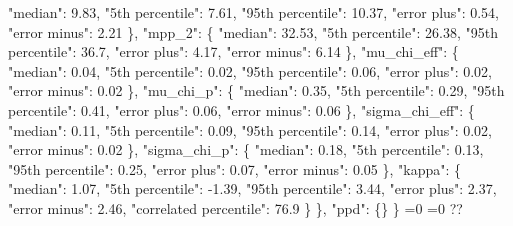 {{          "median": 9.83, %
          "5th percentile": 7.61, %
          "95th percentile": 10.37, %
          "error plus": 0.54, %
          "error minus": 2.21%
        \}, %
        "mpp\_2": \{%
          "median": 32.53, %
          "5th percentile": 26.38, %
          "95th percentile": 36.7, %
          "error plus": 4.17, %
          "error minus": 6.14%
        \}, %
        "mu\_chi\_eff": \{%
          "median": 0.04, %
          "5th percentile": 0.02, %
          "95th percentile": 0.06, %
          "error plus": 0.02, %
          "error minus": 0.02%
        \}, %
        "mu\_chi\_p": \{%
          "median": 0.35, %
          "5th percentile": 0.29, %
          "95th percentile": 0.41, %
          "error plus": 0.06, %
          "error minus": 0.06%
        \}, %
        "sigma\_chi\_eff": \{%
          "median": 0.11, %
          "5th percentile": 0.09, %
          "95th percentile": 0.14, %
          "error plus": 0.02, %
          "error minus": 0.02%
        \}, %
        "sigma\_chi\_p": \{%
          "median": 0.18, %
          "5th percentile": 0.13, %
          "95th percentile": 0.25, %
          "error plus": 0.07, %
          "error minus": 0.05%
        \}, %
        "kappa": \{%
          "median": 1.07, %
          "5th percentile": {-}1.39, %
          "95th percentile": 3.44, %
          "error plus": 2.37, %
          "error minus": 2.46, %
          "correlated percentile": 76.9%
        \}%
      \}, %
      "ppd": \{\}%
    \}}%
  \else%
    \ifnum{}=0%
      \let\mzCopulaCorrelationModel@out\mzCopulaCorrelationModel@I%
    \else%
      \ifnum{}=0%
      \let\mzCopulaCorrelationModel@out\mzCopulaCorrelationModel@II%
    \else%
      \def\mzCopulaCorrelationModel@out{%
    ??}%
    \fi\fi
  \fi
  \mzCopulaCorrelationModel@out
}\newcommand\mzCopulaCorrelationModel@I[1][all]{%
  \ifnum\pdfstrcmp{#1}{all}=0%
    \def\mzCopulaCorrelationModel@I@out{%
    \{%
      "alpha\_1": \{%
        "median": 1.34, %
        "5th percentile": {-}1.26, %
        "95th percentile": 3.02, %
        "error plus": 1.68, %
        "error minus": 2.61%
      \}, %
      "alpha\_2": \{%
        "median": 4.52, %
        "5th percentile": 3.05, %
        "95th percentile": 6.05, %
        "error plus": 1.53, %
        "error minus": 1.47%
      \}, %
      "beta": \{%
        "median": 1.13, %
        "5th percentile": 0.15, %
        "95th percentile": 2.34, %
        "error plus": 1.21, %
        "error minus": 0.98%
      \}, %
      "break\_mass": \{%
        "median": 36.02, %
        "5th percentile": 23.39, %
}}
